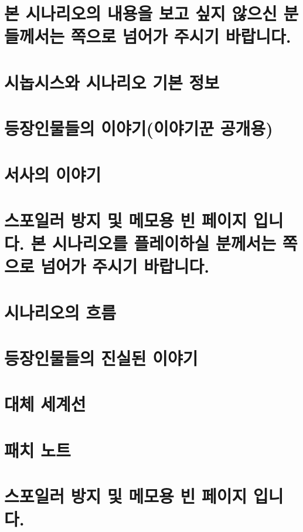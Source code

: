 \documentclass{report}
\begin{document}
	\chapter*{본 시나리오의 내용을 보고 싶지 않으신 분들께서는 \pageref{endof_Unliving}쪽으로 넘어가 주시기 바랍니다.}
	
	\chapter{시놉시스와 시나리오 기본 정보}
	
	\chapter{등장인물들의 이야기(이야기꾼 공개용)}
	
	\chapter{서사의 이야기}
	
	\chapter*{스포일러 방지 및 메모용 빈 페이지 입니다. 본 시나리오를 플레이하실 분께서는 \pageref{endof_Unliving}쪽으로 넘어가 주시기 바랍니다.}
	
	\parttoc
	
	\chapter{시나리오의 흐름}
		
	
	\chapter{등장인물들의 진실된 이야기}
	
	\chapter{대체 세계선}
		
		
	\chapter{패치 노트}
		
		
	\chapter*{스포일러 방지 및 메모용 빈 페이지 입니다.}
\end{document}
